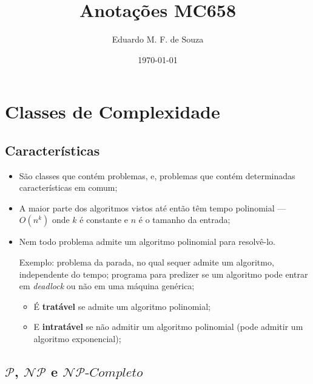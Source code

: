 \documentclass[a4paper,oneside,article,table]{article}
\title{Anotações MC658}
\author{Eduardo M. F. de Souza}
\date{\today}
\renewcommand{\P}{\mathcal{P}}
\newcommand{\NP}{\mathcal{NP}}
\newcommand{\NPC}{\mathcal{NP}\textit{-Completo}}
\begin{document}
\maketitle


\tableofcontents
\newpage

\section{Classes de Complexidade}

\subsection{Características}

\begin{itemize}

    \item São classes que contém problemas, e, problemas que contém determinadas características em comum;
    \item A maior parte dos algoritmos vistos até então têm tempo polinomial --- $O(n^k)$ onde $k$ é constante e $n$ é o tamanho da entrada;
    \item Nem todo problema admite um algoritmo polinomial para resolvê-lo. \par
        Exemplo: problema da parada, no qual sequer admite um algoritmo, independente do tempo; programa para predizer se um algoritmo pode entrar em \textit{deadlock} ou não em uma máquina genérica;
        \begin{itemize}
        \item É \textbf{tratável} se admite um algoritmo polinomial;
        \item E \textbf{intratável} se não admitir um algoritmo polinomial (pode admitir um algoritmo exponencial);
    \end{itemize}

\end{itemize}

\subsection{$\P$, $\NP$ e $\NPC$}
\end{document}
